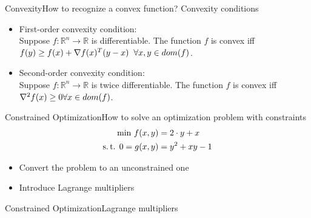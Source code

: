 \begin{frame}{Convexity}{How to recognize a convex function? Convexity conditions}
	\begin{itemize}
		\item First-order convexity condition:\\ Suppose $f : \mathbb{R}^n \rightarrow \mathbb{R}$ is differentiable. The function $f$ is convex iff $f(y) \ge f(x) + \nabla f(x)^T(y - x) \hspace{0.2cm}\forall x, y \in dom(f)$.
		\item Second-order convexity condition:\\ Suppose $f : \mathbb{R}^n \rightarrow \mathbb{R}$ is twice differentiable. The function $f$ is convex iff $\nabla^2 f(x) \ge 0 \vspace{0.2cm}\forall x \in dom(f)$.
	\end{itemize}
\end{frame}

\begin{frame}{Constrained Optimization}{How to solve an optimization problem with constraints}
	\begin{align*}
		\text{min } f(x,y) &= 2\cdot y + x\\
		\text{s.\,t. } 0 = g(x,y) &= y^2 +xy -1\\
	\end{align*}
	\begin{itemize}
		\item Convert the problem to an unconstrained one\\
		\item Introduce Lagrange multipliers
	\end{itemize}
\end{frame}

\begin{frame}{Constrained Optimization}{Lagrange multipliers}
\end{frame}

